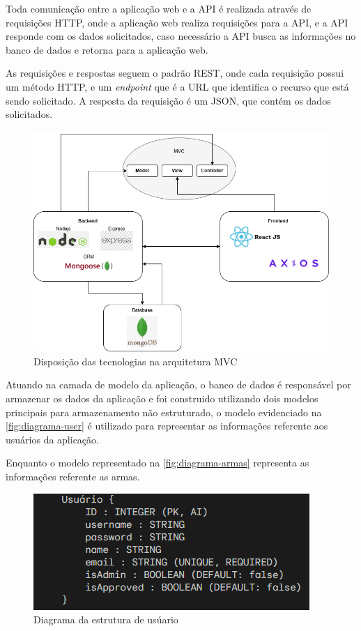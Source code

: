 Toda comunicação entre a aplicação web e a API é realizada através de requisições HTTP, onde a aplicação web realiza requisições para a API, e a API responde com os dados solicitados, caso necessário a API busca as informações no banco de dados e retorna para a aplicação web.

As requisições e respostas seguem o padrão REST, onde cada requisição possui um método HTTP, e um \textit{endpoint} que é a URL que identifica o recurso que está sendo solicitado. A resposta da requisição é um JSON, que contém os dados solicitados.

\begin{figure}[H]
    \caption{\label{fig:diagramstacks}Disposição das tecnologias na arquitetura MVC}
    \begin{center}
        \includegraphics[scale=0.5]{imagens/diagrama.png}
    \end{center}
\end{figure}

Atuando na camada de modelo da aplicação, o banco de dados é responsável por armazenar os dados da aplicação e foi construido utilizando dois modelos principais para armazenamento não estruturado, o modelo evidenciado na \autoref{fig:diagrama-user} é utilizado para representar as informações referente aos usuários da aplicação.

Enquanto o modelo representado na \autoref{fig:diagrama-armas} representa as informações referente as armas.


\begin{figure}[H]
    \caption{\label{fig:diagrama-user}Diagrama da estrutura de usúario}
    \begin{center}
        \includegraphics[scale=1]{imagens/diagramaUser.png}
    \end{center}
\end{figure}

